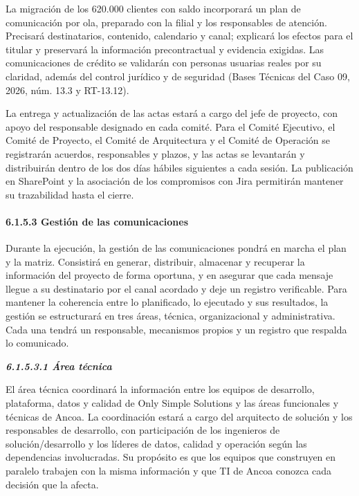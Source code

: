 \documentclass[11pt]{article}
\begin{document}
La migración de los 620.000 clientes con saldo incorporará un plan de
comunicación por ola, preparado con la filial y los responsables de
atención. Precisará destinatarios, contenido, calendario y canal;
explicará los efectos para el titular y preservará la información
precontractual y evidencia exigidas. Las comunicaciones de crédito se
validarán con personas usuarias reales por su claridad, además del
  control jurídico y de seguridad (Bases Técnicas del Caso 09, 2026,
  núm. 13.3 y RT-13.12).

La entrega y actualización de las actas estará a cargo del jefe de
proyecto, con apoyo del responsable designado en cada comité. Para el
Comité Ejecutivo, el Comité de Proyecto, el Comité de Arquitectura y el
Comité de Operación se registrarán acuerdos, responsables y plazos, y
las actas se levantarán y distribuirán dentro de los dos días hábiles
siguientes a cada sesión. La publicación en SharePoint y la asociación
de los compromisos con Jira permitirán mantener su trazabilidad hasta el
cierre.

\paragraph{6.1.5.3 Gestión de las comunicaciones}\label{6-1-5-3-gestion-de-las-comunicaciones}

Durante la ejecución, la gestión de las comunicaciones pondrá en marcha el plan y la matriz. Consistirá en generar, distribuir, almacenar y recuperar la información del proyecto de forma oportuna, y en asegurar que cada mensaje llegue a su destinatario por el canal acordado y deje un registro verificable. Para mantener la coherencia entre lo planificado, lo ejecutado y sus resultados, la gestión se estructurará en tres áreas, técnica, organizacional y administrativa. Cada una tendrá un responsable, mecanismos propios y un registro que respalda lo comunicado.

\emph{\textbf{6.1.5.3.1 Área técnica}}

El área técnica coordinará la información entre los equipos de
desarrollo, plataforma, datos y calidad de Only Simple Solutions y las
áreas funcionales y técnicas de Ancoa. La coordinación estará a cargo
del arquitecto de solución y los responsables de desarrollo, con
participación de los ingenieros de solución/desarrollo y los líderes de
datos, calidad y operación según las dependencias involucradas. Su
propósito es que los equipos que construyen en paralelo trabajen con la
misma información y que TI de Ancoa conozca cada decisión que la afecta.
\end{document}
